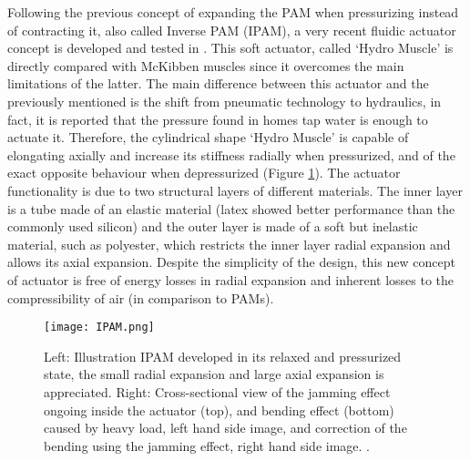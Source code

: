 Following the previous concept of expanding the PAM when pressurizing instead of contracting it, also called Inverse PAM (IPAM), a very recent fluidic actuator concept is developed and tested in \cite{Sridar2016}. This soft actuator, called `Hydro Muscle' is directly compared with McKibben muscles since it overcomes the main limitations of the latter. The main difference between this actuator and the previously mentioned is the shift from pneumatic technology to hydraulics, in fact, it is reported that the pressure found in homes tap water is enough to actuate it. Therefore, the cylindrical shape `Hydro Muscle' is capable of elongating axially and increase its stiffness radially when pressurized, and of the exact opposite behaviour when depressurized (Figure \ref{fig:IPAM}). The actuator functionality is due to two structural layers of different materials. The inner layer is a tube made of an elastic material (latex showed better performance than the commonly used silicon) and the outer layer is made of a soft but inelastic material, such as polyester, which restricts the inner layer radial expansion and allows its axial expansion. Despite the simplicity of the design, this new concept of actuator is free of energy losses in radial expansion and inherent losses to the compressibility of air (in comparison to PAMs). 

\begin{figure}[hb!]
    \centering
    \texttt{[image: IPAM.png]}
    \caption{Left: Illustration IPAM developed in its relaxed and pressurized state, the small radial expansion and large axial expansion is appreciated. Right: Cross-sectional view of the jamming effect ongoing inside the actuator (top), and bending effect (bottom) caused by heavy load, left hand side image, and correction of the bending using the jamming effect, right hand side image. \cite{Sridar2016}. }
    \label{fig:IPAM}
\end{figure}

